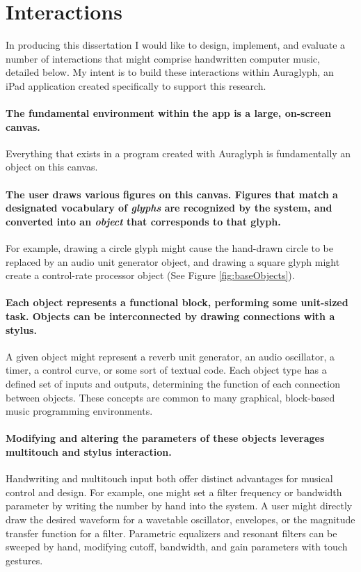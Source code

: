 \documentclass[10pt,letterpaper]{article}
\begin{document}
\section{Interactions}
\label{sec:Interactions}

In producing this dissertation I would like to design, implement, and evaluate a number of interactions that might comprise handwritten computer music, detailed below. 
My intent is to build these interactions within Auraglyph, an iPad application created specifically to support this research. 

\paragraph{The fundamental environment within the app is a large, on-screen canvas.} 
Everything that exists in a program created with Auraglyph is fundamentally an object on this canvas. 

\paragraph{The user draws various figures on this canvas. 
Figures that match a designated vocabulary of \emph{glyphs} are recognized by the system, and converted into an \emph{object} that corresponds to that glyph.} 
For example, drawing a circle glyph might cause the hand-drawn circle to be replaced by an audio unit generator object, and drawing a square glyph might create a control-rate processor object (See Figure \ref{fig:baseObjects}).

\paragraph{Each object represents a functional block, performing some unit-sized task.
Objects can be interconnected by drawing connections with a stylus.}
A given object might represent a reverb unit generator, an audio oscillator, a timer, a control curve, or some sort of textual code. 
Each object type has a defined set of inputs and outputs, determining the function of each connection between objects. 
These concepts are common to many graphical, block-based music programming environments. 

\paragraph{Modifying and altering the parameters of these objects leverages multitouch and stylus interaction.}
Handwriting and multitouch input both offer distinct advantages for musical control and design. 
For example, one might set a filter frequency or bandwidth parameter by writing the number by hand into the system. 
A user might directly draw the desired waveform for a wavetable oscillator, envelopes, or the magnitude transfer function for a filter. 
Parametric equalizers and resonant filters can be sweeped by hand, modifying cutoff, bandwidth, and gain parameters with touch gestures. 
\end{document}
